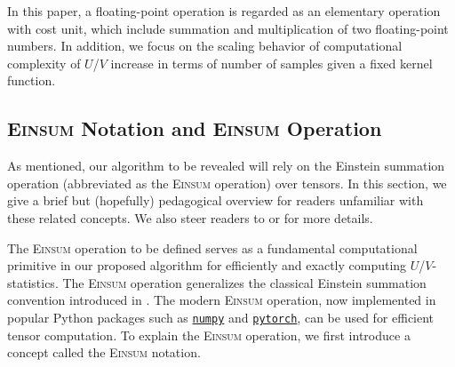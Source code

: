 \documentclass[letterpaper,11pt]{article}
\def\Einsum{\textsc{Einsum}}
\newcommand{\libref}[2]{\href{#2}{\texttt{#1}}}
\newcommand{\numpy}{\libref{numpy}{https://numpy.org/}}
\newcommand{\torch}{\libref{pytorch}{https://pytorch.org/}}
\begin{document}
\begin{bibunit}[plainnat]
In this paper, a floating-point operation is regarded as an elementary operation with cost unit, which include summation and multiplication of two floating-point numbers. In addition, we focus on the scaling behavior of computational complexity of $U$/$V$ increase in terms of number of samples given a fixed kernel function.
\fi

\subsection{\Einsum{} Notation and \Einsum{} Operation}
\label{sec:pre_tensor_contraction}

As mentioned, our algorithm to be revealed will rely on the Einstein summation operation (abbreviated as the \Einsum{} operation) over tensors. In this section, we give a brief but (hopefully) pedagogical overview for readers unfamiliar with these related concepts. We also steer readers to \citet{klaus2023compiling} or \citet{blacher2024einsum} for more details. %

The \Einsum{} operation to be defined serves as a fundamental computational primitive in our proposed algorithm for efficiently and exactly computing $U$/$V$-statistics. The \Einsum{} operation generalizes the classical Einstein summation convention introduced in \cite{einstein1916grundlage}. The modern \Einsum{} operation, now implemented in popular Python packages such as \numpy{} and \torch{}, can be used for efficient tensor computation. To explain the \Einsum{} operation, we first introduce a concept called the \Einsum{} notation.


\end{bibunit}
\end{document}
